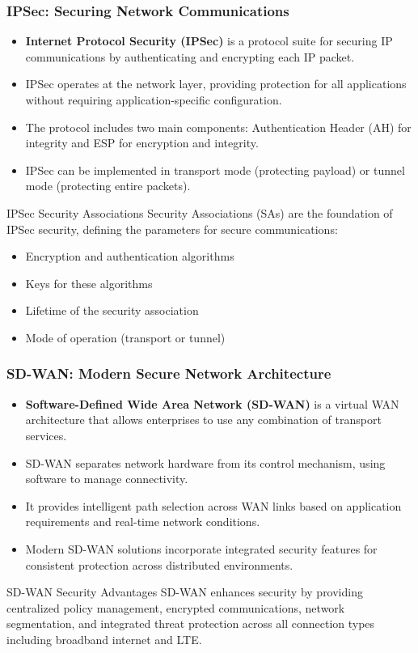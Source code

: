 \documentclass{beamer}
\begin{document}
\begin{frame}
    \frametitle{IPSec: Securing Network Communications}
    \begin{itemize}
        \item \textbf{Internet Protocol Security (IPSec)} is a protocol suite for securing IP communications by authenticating and encrypting each IP packet.
        \item IPSec operates at the network layer, providing protection for all applications without requiring application-specific configuration.
        \item The protocol includes two main components: Authentication Header (AH) for integrity and ESP for encryption and integrity.
        \item IPSec can be implemented in transport mode (protecting payload) or tunnel mode (protecting entire packets).
    \end{itemize}
    
    \begin{block}{IPSec Security Associations}
        Security Associations (SAs) are the foundation of IPSec security, defining the parameters for secure communications:
        \begin{itemize}
            \item Encryption and authentication algorithms
            \item Keys for these algorithms
            \item Lifetime of the security association
            \item Mode of operation (transport or tunnel)
        \end{itemize}
    \end{block}
\end{frame}

\begin{frame}
    \frametitle{SD-WAN: Modern Secure Network Architecture}
    \begin{itemize}
        \item \textbf{Software-Defined Wide Area Network (SD-WAN)} is a virtual WAN architecture that allows enterprises to use any combination of transport services.
        \item SD-WAN separates network hardware from its control mechanism, using software to manage connectivity.
        \item It provides intelligent path selection across WAN links based on application requirements and real-time network conditions.
        \item Modern SD-WAN solutions incorporate integrated security features for consistent protection across distributed environments.
    \end{itemize}
    
    \begin{alertblock}{SD-WAN Security Advantages}
        SD-WAN enhances security by providing centralized policy management, encrypted communications, network segmentation, and integrated threat protection across all connection types including broadband internet and LTE.
    \end{alertblock}
\end{frame}
\end{document}

